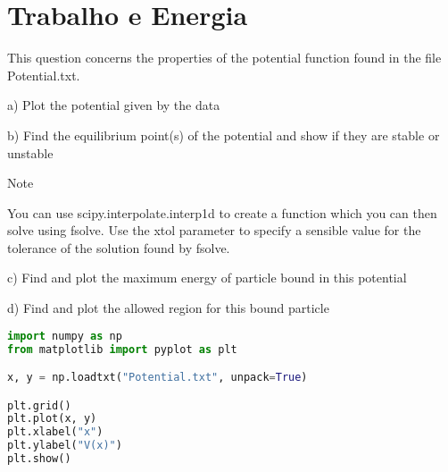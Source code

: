 \chapter{Trabalho e Energia}

This question concerns the properties of the potential function found in the file Potential.txt.

a) Plot the potential given by the data

b) Find the equilibrium point(s) of the potential and show if they are stable or unstable

Note

You can use scipy.interpolate.interp1d to create a function which you can then solve using fsolve. Use the xtol parameter to specify a sensible value for the tolerance of the solution found by fsolve.

c) Find and plot the maximum energy of particle bound in this potential

d) Find and plot the allowed region for this bound particle

\begin{lstlisting}[language=Python, frame=lines,basicstyle=\footnotesize, caption={Plot dos dados disponíveis no arquivo Potential.txt}, label={lst:Potential}]
import numpy as np
from matplotlib import pyplot as plt

x, y = np.loadtxt("Potential.txt", unpack=True)

plt.grid()
plt.plot(x, y)
plt.xlabel("x")
plt.ylabel("V(x)")
plt.show()
\end{lstlisting}

